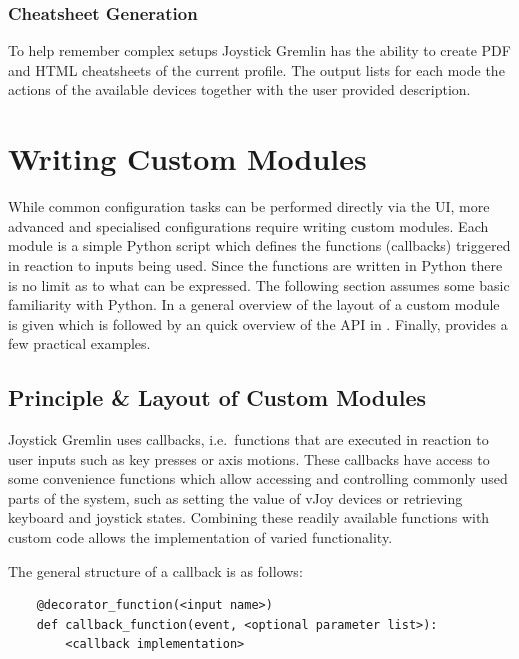 \documentclass[a4, 10pt]{article}
\newcommand{\JG}{Joystick Gremlin}
\begin{document}
\subsubsection{Cheatsheet Generation}

To help remember complex setups \JG{} has the ability to create PDF and
HTML cheatsheets of the current profile. The output lists for each mode
the actions of the available devices together with the user provided
description.


\section{Writing Custom Modules}
\label{sec:custom_modules}

While common configuration tasks can be performed directly via the UI,
more advanced and specialised configurations require writing custom
modules. Each module is a simple Python script which defines the
functions (callbacks) triggered in reaction to inputs being used. Since
the functions are written in Python there is no limit as to what can be
expressed. The following section assumes some basic familiarity with
Python. In  a general overview of the layout of a
custom module is given which is followed by an quick overview of the API
in . Finally,  provides a few
practical examples.


\subsection{Principle \& Layout of Custom Modules}
\label{sec:cm_principles}

Joystick Gremlin uses callbacks, i.e.\ functions that are executed in
reaction to user inputs such as key presses or axis motions. These
callbacks have access to some convenience functions which allow
accessing and controlling commonly used parts of the system, such as
setting the value of vJoy devices or retrieving keyboard and joystick
states. Combining these readily available functions with custom code
allows the implementation of varied functionality.

The general structure of a callback is as follows:
\begin{verbatim}
    @decorator_function(<input name>)
    def callback_function(event, <optional parameter list>):
        <callback implementation>
\end{verbatim}
\end{document}
